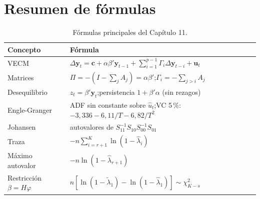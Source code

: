 \section{Resumen de fórmulas}

\begin{table}[H]
\centering\small
\begin{tabular}{@{}ll@{}}
\toprule
Concepto & Fórmula \\
\midrule
VECM & $\Delta\mathbf y_t=\mathbf c+\alpha\beta'\mathbf y_{t-1}+\sum_{i=1}^{p-1}\Gamma_i\Delta\mathbf y_{t-i}+\mathbf u_t$ \\
Matrices & $\Pi=-(I-\sum_jA_j)=\alpha\beta'$;\quad $\Gamma_i=-\sum_{j>i}A_j$ \\
Desequilibrio & $z_t=\beta'\mathbf y_t$;\quad persistencia $1+\beta'\alpha$ (sin rezagos) \\
Engle-Granger & ADF sin constante sobre $\hat u_t$;\quad VC 5\,\%: $-3{,}336-6{,}11/T-6{,}82/T^2$ \\
Johansen & autovalores de $S_{11}^{-1}S_{10}S_{00}^{-1}S_{01}$ \\
Traza & $-n\sum_{i=r+1}^{K}\ln(1-\hat\lambda_i)$ \\
Máximo autovalor & $-n\ln(1-\hat\lambda_{r+1})$ \\
Restricción $\beta=H\varphi$ & $n[\ln(1-\tilde\lambda_1)-\ln(1-\hat\lambda_1)]\sim\chi^2_{K-s}$ \\
\bottomrule
\end{tabular}
\caption{Fórmulas principales del Capítulo 11.}
\end{table}

